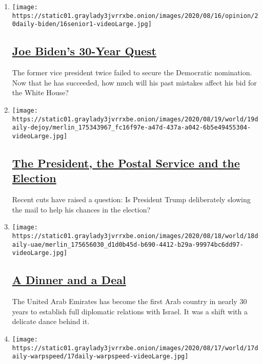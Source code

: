 \begin{enumerate}
\def\labelenumi{\arabic{enumi}.}
\item
  \texttt{[image: https://static01.graylady3jvrrxbe.onion/images/2020/08/16/opinion/20daily-biden/16senior1-videoLarge.jpg]}

  \hypertarget{joe-bidens-30-year-quest}{%
  \subsection{\texorpdfstring{\href{/2020/08/20/podcasts/the-daily/biden-election.html}{Joe
  Biden's 30-Year
  Quest}}{Joe Biden's 30-Year Quest}}\label{joe-bidens-30-year-quest}}

  The former vice president twice failed to secure the Democratic
  nomination. Now that he has succeeded, how much will his past mistakes
  affect his bid for the White House?
\item
  \texttt{[image: https://static01.graylady3jvrrxbe.onion/images/2020/08/19/world/19daily-dejoy/merlin\_175343967\_fc16f97e-a47d-437a-a042-6b5e49455304-videoLarge.jpg]}

  \hypertarget{the-president-the-postal-service-and-the-election}{%
  \subsection{\texorpdfstring{\href{/2020/08/19/podcasts/the-daily/dejoy-postal-service-trump.html}{The
  President, the Postal Service and the
  Election}}{The President, the Postal Service and the Election}}\label{the-president-the-postal-service-and-the-election}}

  Recent cuts have raised a question: Is President Trump deliberately
  slowing the mail to help his chances in the election?
\item
  \texttt{[image: https://static01.graylady3jvrrxbe.onion/images/2020/08/18/world/18daily-uae/merlin\_175656030\_d1d0b45d-b690-4412-b29a-99974bc6dd97-videoLarge.jpg]}

  \hypertarget{a-dinner-and-a-deal}{%
  \subsection{\texorpdfstring{\href{/2020/08/18/podcasts/the-daily/israel-UAE.html}{A
  Dinner and a Deal}}{A Dinner and a Deal}}\label{a-dinner-and-a-deal}}

  The United Arab Emirates has become the first Arab country in nearly
  30 years to establish full diplomatic relations with Israel. It was a
  shift with a delicate dance behind it.
\item
  \texttt{[image: https://static01.graylady3jvrrxbe.onion/images/2020/08/17/world/17daily-warpspeed/17daily-warpspeed-videoLarge.jpg]}


\end{enumerate}
